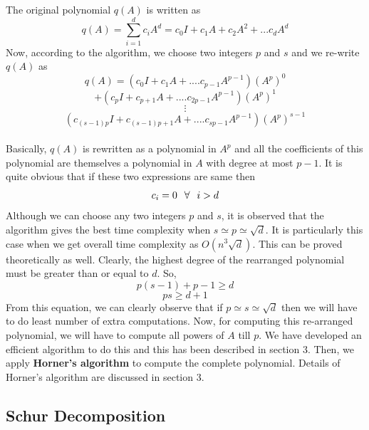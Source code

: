 \documentclass[12pt,a4paper]{article}
\begin{document}
The original polynomial $q(A)$ is written as 
$$q(A) = \sum_{i=1}^{d} c_{i}A^{d} = c_{0}I + c_{1}A + c_{2}A^{2} + ... c_{d}A^{d}$$
Now, according to the algorithm, we choose two integers $p$ and $s$ and we re-write $q(A)$ as
$$q(A) = (c_{0}I + c_{1}A + .... c_{p-1}A^{p-1})(A^{p})^{0}$$ $$ + (c_{p}I + c_{p+1}A + .... c_{2p-1}A^{p-1})(A^{p})^{1}$$ $$\vdots$$ $$(c_{(s-1)p}I + c_{(s-1)p+1}A + .... c_{sp-1}A^{p-1})(A^{p})^{s-1}$$
\\
Basically, $q(A)$ is rewritten as a polynomial in $A^{p}$ and all the coefficients of this polynomial are themselves a polynomial in $A$ with degree at most $p-1$. It is quite obvious that if these two expressions are same then 
$$c_{i} = 0 \hspace{0.25cm} \forall \hspace{0.25cm} i > d$$ 
Although we can choose any two integers $p$ and $s$, it is observed that the algorithm gives the best time complexity when $s \simeq p \simeq \sqrt{d}$. It is particularly this case when we get overall time complexity as $O(n^{3}\sqrt{d})$. This can be proved theoretically as well. Clearly, the highest degree of the rearranged polynomial must be greater than or equal to $d$. So, 
$$p(s-1) + p-1 \geq d$$
$$ps \geq d+1$$
From this equation, we can clearly observe that if $p \simeq s \simeq \sqrt{d}$ then we will have to do least number of extra computations. Now, for computing this re-arranged polynomial, we will have to compute all powers of $A$ till $p$. We have developed an efficient algorithm to do this and this has been described in section 3. Then, we apply \textbf{Horner's algorithm} to compute the complete polynomial. Details of Horner's algorithm are discussed in section 3.
\newpage
\subsection{Schur Decomposition}
\end{document}
